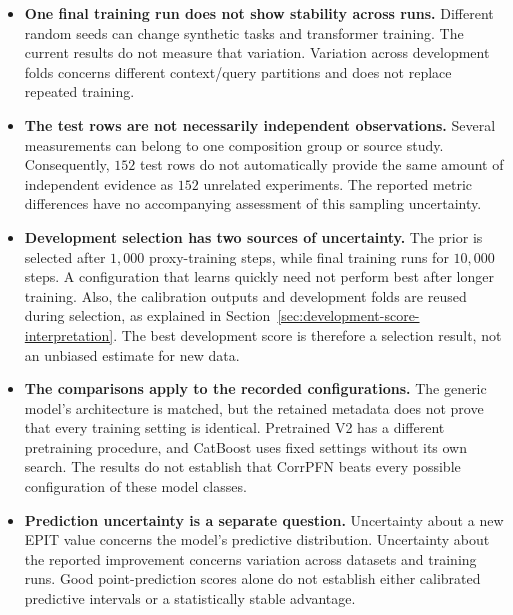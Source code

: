 \documentclass[11pt]{article}
\newenvironment{notes}
  {\begin{itemize}\setlength{\itemsep}{0.45em}\setlength{\parsep}{0pt}}
  {\end{itemize}}
\begin{document}
\begin{notes}
    \item \textbf{One final training run does not show stability across runs.}
    Different random seeds can change synthetic tasks and
    transformer training. The current results do not measure
    that variation. Variation across development folds
    concerns different context/query partitions and does
    not replace repeated training.

    \item \textbf{The test rows are not necessarily independent observations.}
    Several measurements can belong to one composition group
    or source study. Consequently, \(152\) test rows do not
    automatically provide the same amount of independent
    evidence as \(152\) unrelated experiments.
    The reported metric differences have no accompanying
    assessment of this sampling uncertainty.

    \item \textbf{Development selection has two sources of uncertainty.}
    The prior is selected after \(1{,}000\) proxy-training
    steps, while final training runs for \(10{,}000\) steps.
    A configuration that learns quickly need not perform
    best after longer training.
    Also, the calibration outputs and development folds are
    reused during selection, as explained in
    Section~\ref{sec:development-score-interpretation}.
    The best development score is therefore a selection
    result, not an unbiased estimate for new data.

    \item \textbf{The comparisons apply to the recorded configurations.}
    The generic model's architecture is matched, but the
    retained metadata does not prove that every training
    setting is identical. Pretrained V2 has a different
    pretraining procedure, and CatBoost uses fixed settings
    without its own search.
    The results do not establish that CorrPFN beats every
    possible configuration of these model classes.

    \item \textbf{Prediction uncertainty is a separate question.}
    Uncertainty about a new EPIT value concerns the model's
    predictive distribution. Uncertainty about the reported
    improvement concerns variation across datasets and
    training runs. Good point-prediction scores alone do
    not establish either calibrated predictive intervals
    or a statistically stable advantage.
\end{notes}
\end{document}

